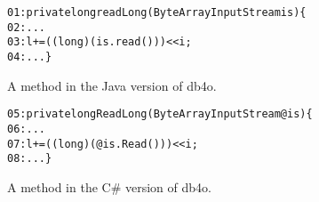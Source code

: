 \begin{figure}[t]
\begin{CodeOut}%
\begin{alltt}
01: private long readLong(ByteArrayInputStream is)\{
02:  ...
03:  l += ((long) (is.read())) << i;
04:  ...\}
\end{alltt}
\end{CodeOut}\vspace*{-4ex}
\caption{A method in the Java version of db4o.}%
\label{fig:db4ojava}
\begin{CodeOut}%
\begin{alltt}
05: private long ReadLong(ByteArrayInputStream @is)\{
06:  ...
07:  l += ((long)(@is.Read())) << i;
08:  ...\}
\end{alltt}
\end{CodeOut}\vspace*{-4ex}
\caption{A method in the C\# version of db4o.}\vspace*{-4ex}
\label{fig:db40net}
\end{figure}

